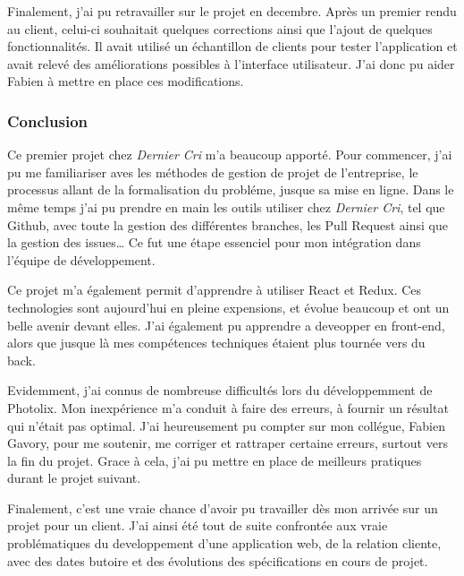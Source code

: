 \documentclass[12pt,a4paper]{article}
\begin{document}
  \bigskip

  Finalement, j'ai pu retravailler sur le projet en decembre. Après un
  premier rendu au client, celui-ci souhaitait quelques corrections ainsi
  que l'ajout de quelques fonctionnalités. Il avait utilisé un échantillon
  de clients pour tester l'application et avait relevé des améliorations
  possibles à l'interface utilisateur. J'ai donc pu aider Fabien à mettre
  en place ces modifications.

  \bigskip

  \subsubsection{Conclusion}\label{conclusion}

  \bigskip

  Ce premier projet chez \emph{Dernier Cri} m'a beaucoup apporté. Pour
  commencer, j'ai pu me familiariser aves les méthodes de gestion de
  projet de l'entreprise, le processus allant de la formalisation du
  probléme, jusque sa mise en ligne. Dans le même temps j'ai pu prendre en
  main les outils utiliser chez \emph{Dernier Cri}, tel que Github, avec
  toute la gestion des différentes branches, les Pull Request ainsi que la
  gestion des issues\ldots{} Ce fut une étape essenciel pour mon
  intégration dans l'équipe de développement.

  \bigskip

  Ce projet m'a également permit d'apprendre à utiliser React et Redux.
  Ces technologies sont aujourd'hui en pleine expensions, et évolue
  beaucoup et ont un belle avenir devant elles. J'ai également pu
  apprendre a deveopper en front-end, alors que jusque là mes compétences
  techniques étaient plus tournée vers du back.

  \bigskip

  Evidemment, j'ai connus de nombreuse difficultés lors du développemment
  de Photolix. Mon inexpérience m'a conduit à faire des erreurs, à fournir
  un résultat qui n'était pas optimal. J'ai heureusement pu compter sur
  mon collégue, Fabien Gavory, pour me soutenir, me corriger et rattraper
  certaine erreurs, surtout vers la fin du projet. Grace à cela, j'ai pu
  mettre en place de meilleurs pratiques durant le projet suivant.

  \bigskip

  Finalement, c'est une vraie chance d'avoir pu travailler dès mon arrivée
  sur un projet pour un client. J'ai ainsi été tout de suite confrontée
  aux vraie problématiques du developpement d'une application web, de la
  relation cliente, avec des dates butoire et des évolutions des
  spécifications en cours de projet.
\end{document}
